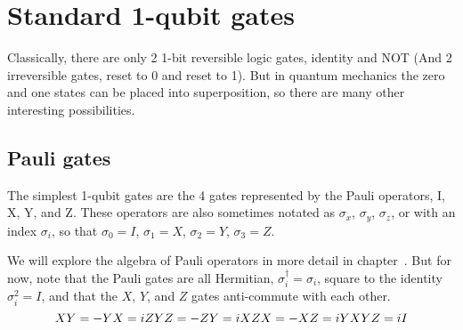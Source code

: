 



\clearpage
\section{Standard 1-qubit gates}


Classically, there are only 2 1-bit reversible logic gates, identity and NOT (And 2 irreversible gates, reset to 0 and reset to 1). But in quantum mechanics the zero and one states can be placed into superposition, so there are many other interesting possibilities. 

\subsection{Pauli gates}
The simplest 1-qubit gates are the 4 gates represented by the Pauli operators, I, X, Y, and Z. These operators are also sometimes notated as $\sigma_x$, $\sigma_y$, $\sigma_z$, or with an index $\sigma_i$, so that $\sigma_0=I$, $\sigma_1=X$, $\sigma_2=Y$, $\sigma_3=Z$. %

We will explore the algebra of Pauli operators in more detail in chapter~. But for now, note that the Pauli gates are all Hermitian, $\sigma_i^\dagger=\sigma_i$, square to the identity $\sigma_i^2 =I$, and that the $X$, $Y$, and $Z$ gates anti-commute with each other.
\[
XY = -YX = iZ \notag \\
YZ = -ZY = iX \notag \\
ZX = -XZ = iY \notag \\
XYZ = iI \notag
\]


